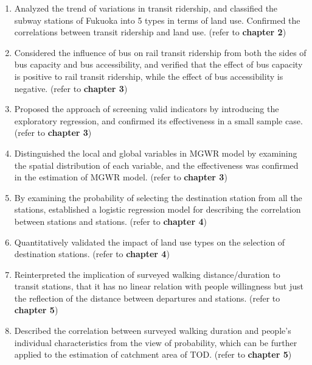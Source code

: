 \begin{enumerate}
	\item Analyzed the trend of variations in transit ridership, and classified the subway stations of Fukuoka into 5 types in terms of land use. Confirmed the correlations between transit ridership and land use. (refer to \textbf{chapter 2})
	
	\item Considered the influence of bus on rail transit ridership from both the sides of bus capacity and bus accessibility, and verified that the effect of bus capacity is positive to rail transit ridership, while the effect of bus accessibility is negative. (refer to \textbf{chapter 3})
	
	\item Proposed the approach of screening valid indicators by introducing the exploratory regression, and confirmed its effectiveness in a small sample case. (refer to \textbf{chapter 3})
	
	\item Distinguished the local and global variables in MGWR model by examining the spatial distribution of each variable, and the effectiveness was confirmed in the estimation of MGWR model. (refer to \textbf{chapter 3})
	
	\item By examining the probability of selecting the destination station from all the stations, established a logistic regression model for describing the correlation between stations and stations. (refer to \textbf{chapter 4})
	
	\item Quantitatively validated the impact of land use types on the selection of destination stations. (refer to \textbf{chapter 4})
	
	\item Reinterpreted the implication of surveyed walking distance/duration to transit stations, that it has no linear relation with people willingness but just the reflection of the distance between departures and stations. (refer to \textbf{chapter 5})
	
	\item Described the correlation between surveyed walking duration and people's individual characteristics from the view of probability, which can be further applied to the estimation of catchment area of TOD. (refer to \textbf{chapter 5})
	
\end{enumerate} 

